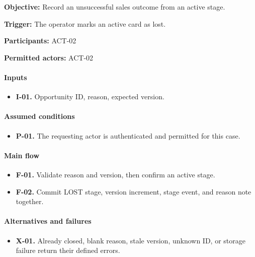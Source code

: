 \documentclass[10pt,a4paper]{article}
\begin{document}
\textbf{Objective:} Record an unsuccessful sales outcome from an active stage.

\textbf{Trigger:} The operator marks an active card as lost.

\textbf{Participants:} ACT-02

\textbf{Permitted actors:} ACT-02

\paragraph{Inputs}

\begin{itemize}

\item \textbf{I-01.} Opportunity ID, reason, expected version.

\end{itemize}

\paragraph{Assumed conditions}

\begin{itemize}

\item \textbf{P-01.} The requesting actor is authenticated and permitted for this case.

\end{itemize}

\paragraph{Main flow}

\begin{itemize}

\item \textbf{F-01.} Validate reason and version, then confirm an active stage.

\item \textbf{F-02.} Commit LOST stage, version increment, stage event, and reason note together.

\end{itemize}

\paragraph{Alternatives and failures}

\begin{itemize}

\item \textbf{X-01.} Already closed, blank reason, stale version, unknown ID, or storage failure return their defined errors.

\end{itemize}
\end{document}
